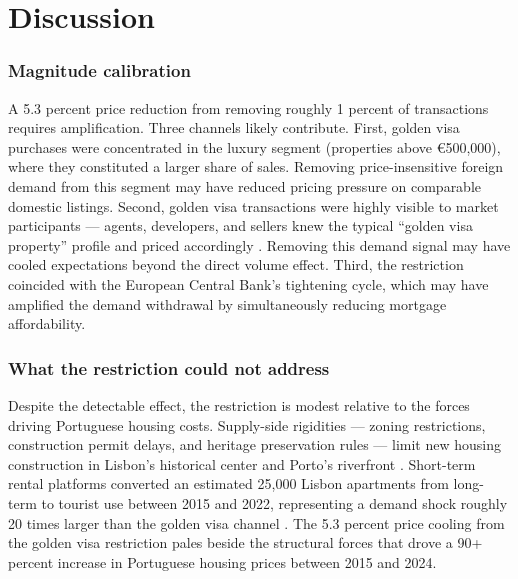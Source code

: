 \documentclass[12pt]{article}
\begin{document}



\section{Discussion}

\subsubsection*{Magnitude calibration} A 5.3 percent price reduction from removing roughly 1 percent of transactions requires amplification. Three channels likely contribute. First, golden visa purchases were concentrated in the luxury segment (properties above \euro500,000), where they constituted a larger share of sales. Removing price-insensitive foreign demand from this segment may have reduced pricing pressure on comparable domestic listings. Second, golden visa transactions were highly visible to market participants --- agents, developers, and sellers knew the typical ``golden visa property'' profile and priced accordingly \citep{dePereiraDosSantos2024}. Removing this demand signal may have cooled expectations beyond the direct volume effect. Third, the restriction coincided with the European Central Bank's tightening cycle, which may have amplified the demand withdrawal by simultaneously reducing mortgage affordability.

\subsubsection*{What the restriction could not address} Despite the detectable effect, the restriction is modest relative to the forces driving Portuguese housing costs. Supply-side rigidities --- zoning restrictions, construction permit delays, and heritage preservation rules --- limit new housing construction in Lisbon's historical center and Porto's riverfront \citep{Alves2023}. Short-term rental platforms converted an estimated 25,000 Lisbon apartments from long-term to tourist use between 2015 and 2022, representing a demand shock roughly 20 times larger than the golden visa channel \citep{Franco2023}. The 5.3 percent price cooling from the golden visa restriction pales beside the structural forces that drove a 90+ percent increase in Portuguese housing prices between 2015 and 2024.
\end{document}
